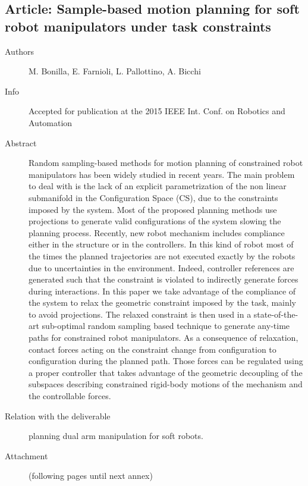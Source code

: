 \documentclass[a4paper,11pt,pdf]{pacmanreport}
\begin{document}
\subsection{Article: Sample-based motion planning for soft robot manipulators under task constraints} \label{ann:softPlanning}
\begin{description}
    \item[Authors] M. Bonilla, E. Farnioli, L. Pallottino, A. Bicchi
    \item[Info] Accepted for publication at the 2015 IEEE Int. Conf. on Robotics and Automation
    \item[Abstract] Random sampling-based methods for motion planning of constrained robot manipulators has been widely studied in recent years. The main problem to deal with is the lack of an explicit parametrization of the non linear submanifold in the Configuration Space (CS), due to the constraints imposed by the system. Most of the proposed planning methods use projections to generate valid configurations of the system slowing the planning process. Recently, new robot mechanism includes compliance either in the structure or in the controllers. In this kind of robot most of the times the planned trajectories are not executed exactly by the robots due to uncertainties in the environment. Indeed, controller references are generated such that the constraint is violated to indirectly generate forces during interactions. In this paper we take advantage of the compliance of the system to relax the geometric constraint imposed by the task, mainly to avoid projections. The relaxed constraint is then used in a state-of-the-art sub-optimal random sampling based technique to generate any-time paths for constrained robot manipulators. As a consequence of relaxation, contact forces acting on the constraint change from configuration to configuration during the planned path. Those forces can be regulated using a proper controller that takes advantage of the geometric decoupling of the subspaces describing constrained
    rigid-body motions of the mechanism and the controllable forces.
    \item[Relation with the deliverable] planning dual arm manipulation for soft robots.
    \item[Attachment] (following pages until next annex)
\end{description}

\end{document}
